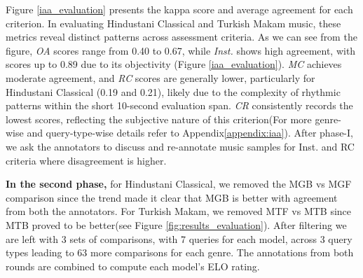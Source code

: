 



Figure \ref{iaa_evaluation} presents the kappa score and average agreement for each criterion.
In evaluating Hindustani Classical and Turkish Makam music, these metrics reveal distinct patterns across assessment criteria. As we can see from the figure, \textit{OA} scores range from 0.40 to 0.67, while \textit{Inst.} shows high agreement, with scores up to 0.89 due to its objectivity (Figure \ref{iaa_evaluation}). \textit{MC} achieves moderate agreement, and \textit{RC} scores are generally lower, particularly for Hindustani Classical (0.19 and 0.21), likely due to the complexity of rhythmic patterns within the short 10-second evaluation span. \textit{CR} consistently records the lowest scores, reflecting the subjective nature of this criterion(For more genre-wise and query-type-wise details refer to Appendix\ref{appendix:iaa}). After phase-I, we ask the annotators to discuss and re-annotate music samples for Inst. and RC criteria where disagreement is higher.

\textbf{In the second phase,} for Hindustani Classical, we removed the MGB vs MGF comparison since the trend made it clear that MGB is better with agreement from both the annotators. For Turkish Makam, we removed MTF vs MTB since MTB proved to be better(see Figure \ref{fig:results_evaluation}). After filtering we are left with 3 sets of comparisons, with 7 queries for each model, across 3 query types leading to 63 more comparisons for each genre. The annotations from both rounds are combined to compute each model’s ELO rating.

